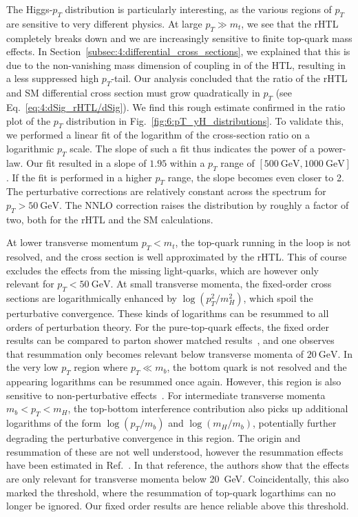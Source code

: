 The Higgs-$p_T$ distribution is particularly interesting, as the various regions of $p_T$ are sensitive to very different physics. At large $p_T \gg m_t$, we see that the \acs{rHTL} completely breaks down and we are increasingly sensitive to finite top-quark mass effects. In Section~\ref{subsec:4:differential_cross_sections}, we explained that this is due to the non-vanishing mass dimension of coupling in of the \acs{HTL}, resulting in a less suppressed high $p_T$-tail. Our analysis concluded that the ratio of the \acs{rHTL} and \acs{SM} differential cross section must grow quadratically in $p_T$ (see Eq.~\eqref{eq:4:dSig_rHTL/dSig}). We find this rough estimate confirmed in the ratio plot of the $p_T$ distribution in Fig.~\ref{fig:6:pT_yH_distributions}. To validate this, we performed a linear fit of the logarithm of the cross-section ratio on a logarithmic $p_T$ scale. The slope of such a fit thus indicates the power of a power-law. Our fit resulted in a slope of $1.95$ within a $p_T$ range of $[500\ \mathrm{GeV}, 1000\ \mathrm{GeV}]$. If the fit is performed in a higher $p_T$ range, the slope becomes even closer to 2. The perturbative corrections are relatively constant across the spectrum for $p_T > 50\ \mathrm{GeV}$. The \acs{NNLO} correction raises the distribution by roughly a factor of two, both for the \acs{rHTL} and the \acs{SM} calculations.

At lower transverse momentum $p_T < m_t$, the top-quark running in the loop is not resolved, and the cross section is well approximated by the \acs{rHTL}. This of course excludes the effects from the missing light-quarks, which are however only relevant for $p_T < 50\ \mathrm{GeV}$. At small transverse momenta, the fixed-order cross sections are logarithmically enhanced by $\log (p_T^2/m_H^2)$, which spoil the perturbative convergence. These kinds of logarithms can be resummed to all orders of perturbation theory. For the pure-top-quark effects, the fixed order results can be compared to parton shower matched results~\cite{Niggetiedt:2024nmp}, and one observes that resummation only becomes relevant below transverse momenta of $20\ \mathrm{GeV}$. In the very low $p_T$ region where $p_T \ll m_b$, the bottom quark is not resolved and the appearing logarithms can be resummed once again. However, this region is also sensitive to non-perturbative effects~\cite{Kulesza:2003wi}. For intermediate transverse momenta  $m_b < p_T < m_H$, the top-bottom interference contribution also picks up additional logarithms of the form $\log (p_T/m_b)$ and $\log (m_H/m_b)$, potentially further degrading the perturbative convergence in this region. The origin and resummation of these are not well understood, however the resummation effects have been estimated in Ref.~\cite{Caola:2018zye}. In that reference, the authors show that the effects are only relevant for transverse momenta below 20~GeV. Coincidentally, this also marked the threshold, where the resummation of top-quark logarthims can no longer be ignored. Our fixed order results are hence reliable above this threshold.

